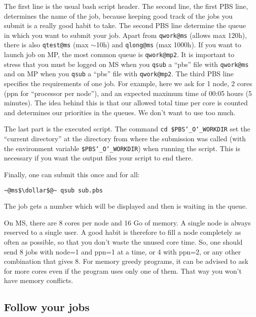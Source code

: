 \documentclass[10pt,letter]{article}
\newcommand{\dollar}{\mbox{\textdollar}}
\begin{document}
The first line is the usual bash script header. 
The second line, the first PBS line, determines the name of the job, 
because keeping good track of the jobs you submit is a really good habit to take. 
The second PBS line determine the queue in which you want to submit your job. 
Apart from \texttt{qwork@ms}  (allows max 120h), there is also \texttt{qtest@ms}  (max $\sim$10h)  and \texttt{qlong@ms}  (max 1000h). 
If you want to launch job on MP, the most common queue is \texttt{qwork@mp2}. 
It is important to stress that you must be logged on MS when you \texttt{qsub}  a ``pbs'' file with \texttt{qwork@ms}  and on MP when you \texttt{qsub}  a ``pbs'' file with \texttt{qwork@mp2}.
The third PBS line specifies the requirements of one job. 
For example, here we ask for 1 node, 2 cores (ppn for ``processor per node''), and an expected maximum time of 00:05 hours (5 minutes). 
The idea behind this is that our allowed total time per core is counted and determines our priorities in the queues. 
We don't want to use too much. 

The last part is the executed script. 
The command \texttt{cd \$PBS\char`_O\char`_WORKDIR}  set the ``current directory'' at the directory from where the submission was called (with the environment variable \texttt{\$PBS\char`_O\char`_WORKDIR}) when running the script. 
This is necessary if you want the output files your script to end there. 

Finally, one can submit this once and for all:

\begin{bashInput}
\begin{lstlisting}[style=BashInputStyle]
~@ms$\dollar$@~ qsub sub.pbs
\end{lstlisting}
\end{bashInput}
The job gets a number which will be displayed and then is waiting in the queue.


On MS, there are 8 cores per node and 16 Go of memory. 
A single node is always reserved to a single user. 
A good habit is therefore to fill a node completely as often as possible, 
so that you don't waste the unused core time. 
So, one should send 8 jobs with node=1 and ppn=1 at a time, or 4 with ppn=2, or any other combination that gives 8. 
For memory greedy programs, it can be advised to ask for more cores even if the program uses only one of them. 
That way you won't have memory conflicts. 


\subsection{Follow your jobs}
\end{document}
